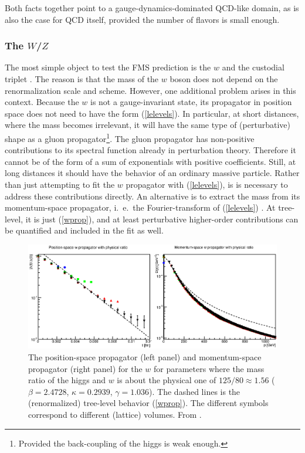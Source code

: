 \documentclass[final,12pt,3p,longtitle]{elsarticle}
\newcommand*{\pref}[1]{(\ref{#1})}
\newcommand*{\1}{1\!\!\!\bot}
\begin{document}
Both facts together point to a gauge-dynamics-dominated QCD-like domain, as is also the case for QCD itself, provided the number of flavors is small enough.

\subsubsection{The $W$/$Z$}\label{sss:w}

The most simple object to test the FMS prediction is the $w$ and the custodial triplet \cite{Maas:2012tj}. The reason is that the mass of the $w$ boson does not depend on the renormalization scale and scheme. However, one additional problem arises in this context. Because the $w$ is not a gauge-invariant state, its propagator in position space does not need to have the form \pref{lelevels}. In particular, at short distances, where the mass becomes irrelevant, it will have the same type of (perturbative) shape as a gluon propagator\footnote{Provided the back-coupling of the higgs is weak enough.}. The gluon propagator has  non-positive contributions to its spectral function \cite{Bohm:2001yx} already in perturbation theory. Therefore it cannot be of the form of a sum of exponentials with positive coefficients. Still, at long distances it should have the behavior of an ordinary massive particle. Rather than just attempting to fit the $w$ propagator with \pref{lelevels}, is is necessary to address these contributions directly. An alternative is to extract the mass from its momentum-space propagator, i.\ e.\ the Fourier-transform of \pref{lelevels} \cite{Maas:2011se}. At tree-level, it is just \pref{wprop}, and at least perturbative higher-order contributions can be quantified and included in the fit as well.

\begin{figure}
\includegraphics[width=\linewidth]{w}
\caption{\label{fig:w}The position-space propagator (left panel) and momentum-space propagator (right panel) for the $w$ for parameters where the mass ratio of the higgs and $w$ is about the physical one of $125/80\approx1.56$ ($\beta=2.4728$, $\kappa=0.2939$, $\gamma=1.036$). The dashed lines is the (renormalized) tree-level behavior \pref{wprop}. The different symbols correspond to different (lattice) volumes. From \cite{Maas:2013aia}.}
\end{figure}
\end{document}
